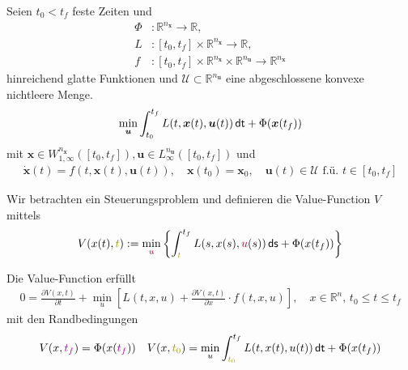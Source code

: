 \documentclass[a4paper, 12pt]{scrartcl}
\newcommand{\lila}[2][lila]{\textcolor{#1}{#2}}
\newcommand{\dunkelrot}[2][dunkelrot]{\textcolor{#1}{#2}}
\newcommand{\dunkelgelb}[2][dunkelgelb]{\textcolor{#1}{#2}}
\newcommand{\dt}{\thinspace \mathsf{dt}}
\newcommand{\ds}{\thinspace \mathsf{ds}}
\begin{document}
\begin{definition}\label{OCP}
    Seien $t_0<t_f$ feste Zeiten und 
    \begin{align*}
        \Phi &: \mathbb{R}^{n_{\bm{x}}} \to \mathbb{R}, \\
        L &: [t_0,t_f] \times \mathbb{R}^{n_{\bm{x}}}  \to \mathbb{R},  \\
        f &: [t_0,t_f] \times \mathbb{R}^{n_{\bm{x}}} \times \mathbb{R}^{n_{\bm{u}}} 
        \to \mathbb{R}^{n_{\bm{x}}}
    \end{align*}
    hinreichend glatte Funktionen und $\mathcal{U} \subset \mathbb{R}^{n_{\bm{u}}}$ 
    eine abgeschlossene konvexe nichtleere Menge. 
    \begin{align*}
        \min_{\bm{u}} \int_{t_0}^{t_f} L(t,\bm{x}(t),\bm{u}(t)) \dt + \Phi(\bm{x}(t_f))
    \end{align*}
    mit $\bm{x} \in W_{1,\infty}^{n_{\bm{x}}}([t_0,t_f]), 
    \bm{u} \in L_{\infty}^{n_{\bm{u}}}([t_0,t_f])$ und 
    \begin{align*}
        \dot{\bm{x}}(t) = f(t,\bm{x}(t),\bm{u}(t)), \quad \bm{x}(t_0) = \bm{x}_0, \quad \bm{u}(t) \in \mathcal{U} \text{ f.ü. } t \in [t_0,t_f]
    \end{align*}
\end{definition}

Wir betrachten ein Steuerungsproblem und definieren die Value-Function $V$ mittels
%
\begin{align*}
    V(x(t),\dunkelgelb{t}) := \min_{\dunkelrot{u}} \left\{ \int_{\dunkelgelb{t}}^{t_f} L(s,x(s),\dunkelrot{u}(s)) \ds + \Phi(x(t_f)) \right\}
\end{align*}

\begin{satz}\label{HJB}
    Die Value-Function erfüllt
    \begin{align*}
        0 = \frac{\partial V(x, t)}{\partial t} 
        + \min_{u} \left[ L(t,x, u) + \frac{\partial V(x,t)}{\partial x} \cdot f(t,x,u) \right], 
        \quad x \in \mathbb{R}^n, \, t_0 \leq t \leq t_f
    \end{align*}
    mit den Randbedingungen
    \begin{align*}
        V(x, \lila{t_f}) = \Phi(x(\lila{t_f})) 
        \quad 
        V(x, \dunkelgelb{t_0} ) = \min_u \int_{\dunkelgelb{t_0}}^{t_f} L(t,x(t),u(t)) \dt + \Phi(x(t_f)) 
    \end{align*}
\end{satz}
\end{document}
